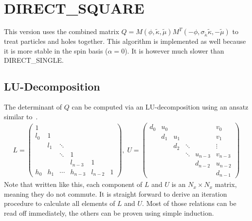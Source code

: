 \documentclass[a4paper, fleqn, twoside, notitlepage]{scrartcl}
\begin{document}
\clearpage
\section{DIRECT\_SQUARE}

This version uses the combined matrix $Q = M(\phi, \tilde{\kappa}, \tilde{\mu}) M^T(-\phi, \sigma_{\tilde{\kappa}}\tilde{\kappa}, -\tilde{\mu})$ to treat particles and holes together.
This algorithm is implemented as well because it is more stable in the spin basis ($\alpha=0$).
It is however much slower than DIRECT\_SINGLE.\@

\subsection{LU-Decomposition}\label{sec:lu_decomposition_v2}

The determinant of $Q$ can be computed via an LU-decomposition using an ansatz similar to~\cite{zivkovic:2013}.
\begin{align}
  L =
  \begin{pmatrix}
    1   &     &        &        &        &\\
    l_0 & 1   &        &        &        &\\
        & l_1 & \ddots &        &        &\\
        &     & \ddots & 1      &        &\\
        &     &        & l_{n-3} & 1      & \\
    h_0 & h_1 & \cdots  & h_{n-3} & l_{n-2} & 1
  \end{pmatrix},
  \; U =
  \begin{pmatrix}
    d_0 & u_0 &        &        &        & v_0    \\
        & d_1 & u_1    &        &        & v_1    \\
        &     & d_2    & \ddots &        & \vdots \\
        &     &        & \ddots & u_{n-3} & v_{n-3} \\
        &     &        &        & d_{n-2} & u_{n-2} \\
        &     &        &        &        & d_{n-1}
  \end{pmatrix}
\end{align}
Note that written like this, each component of $L$ and $U$ is an $N_x \times N_x$ matrix, meaning they do not commute.
It is straight forward to derive an iteration procedure to calculate all elements of $L$ and $U$. Most of those relations can be read off immediately, the others can be proven using
simple induction.\\
\end{document}
